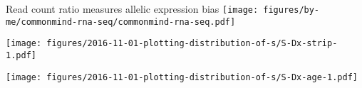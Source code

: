\documentclass{beamer} %
\begin{document}
\begin{frame}{Read count ratio measures allelic expression bias}
\texttt{[image: figures/by-me/commonmind-rna-seq/commonmind-rna-seq.pdf]}
\end{frame}

\begin{frame}

\end{frame}

\begin{frame}[plain]
\begin{center}
\texttt{[image: figures/2016-11-01-plotting-distribution-of-s/S-Dx-strip-1.pdf]}
\end{center}
\end{frame}

\begin{frame}[plain]
\begin{center}
\texttt{[image: figures/2016-11-01-plotting-distribution-of-s/S-Dx-age-1.pdf]}
\end{center}
\end{frame}
\end{document}

